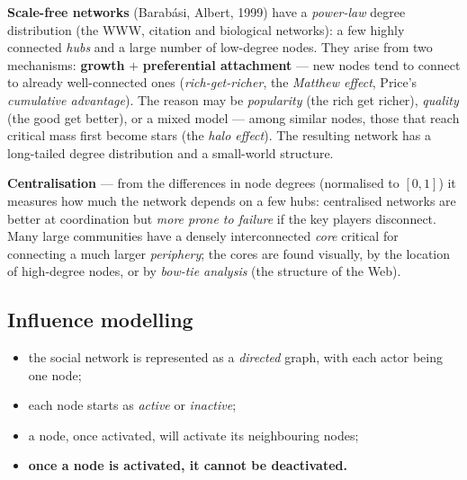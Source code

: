 \documentclass[11pt,a4paper]{article}
\theoremstyle{definition}
\begin{document}
\begin{defbox}
\textbf{Scale-free networks} (Barabási, Albert, 1999) have a \emph{power-law} degree
distribution (the WWW, citation and biological networks): a few highly connected \emph{hubs}
and a large number of low-degree nodes. They arise from two mechanisms: \textbf{growth} $+$
\textbf{preferential attachment} --- new nodes tend to connect to already well-connected ones
(\emph{rich-get-richer}, the \emph{Matthew effect}, Price's \emph{cumulative advantage}). The
reason may be \emph{popularity} (the rich get richer), \emph{quality} (the good get better),
or a mixed model --- among similar nodes, those that reach critical mass first become stars
(the \emph{halo effect}). The resulting network has a long-tailed degree distribution and a
small-world structure.
\end{defbox}

\begin{defbox}
\textbf{Centralisation} --- from the differences in node degrees (normalised to $[0,1]$) it
measures how much the network depends on a few hubs: centralised networks are better at
coordination but \emph{more prone to failure} if the key players disconnect. Many large
communities have a densely interconnected \emph{core} critical for connecting a much larger
\emph{periphery}; the cores are found visually, by the location of high-degree nodes, or by
\emph{bow-tie analysis} (the structure of the Web).
\end{defbox}

\subsection{Influence modelling}

\begin{defbox}
\begin{itemize}
\item the social network is represented as a \emph{directed} graph, with each actor being one node;
\item each node starts as \emph{active} or \emph{inactive};
\item a node, once activated, will activate its neighbouring nodes;
\item \textbf{once a node is activated, it cannot be deactivated.}
\end{itemize}
\end{defbox}
\end{document}
